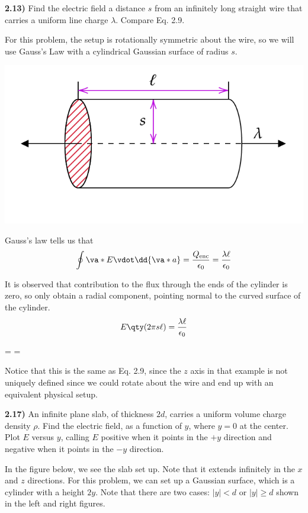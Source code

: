 \documentclass[12pt,a4paper]{article}
\newcommand{\prob}[2]{\textbf{#1)} #2}
\begin{document}
\prob{2.13}{Find the electric field a distance $s$ from an infinitely long straight wire that carries a uniform line charge $\lambda$. Compare Eq. 2.9.}

For this problem, the setup is rotationally symmetric about the wire, so we will use Gauss's Law with a cylindrical Gaussian surface of radius $s$.

\bef
\includegraphics[scale=0.5]{fig1.png}
\eef

Gauss's law tells us that
\begin{align*}
\oint \va*{E} \vdot \dd{\va*{a}} = \frac{Q_{\rm enc}}{\epsilon_0} = \frac{\lambda \ell}{\epsilon_0}
\end{align*}

It is observed that contribution to the flux through the ends of the cylinder is zero, so only obtain a radial component, pointing normal to the curved surface of the cylinder.
\begin{align*}
E\qty(2\pi s \ell) = \frac{\lambda \ell}{\epsilon_0}
\end{align*}
\begin{eqbox}
 =  \shat =  \shat
\end{eqbox}

Notice that this is the same as Eq. 2.9, since the $z$ axis in that example is not uniquely defined since we could rotate about the wire and end up with an equivalent physical setup.

\prob{2.17}{An infinite plane slab, of thickness $2d$, carries a uniform volume charge density $\rho$. Find the electric field, as a function of $y$, where $y = 0$ at the center. Plot $E$ versus $y$, calling $E$ positive when it points in the $+y$ direction and negative when it points in the $-
y$ direction.}

In the figure below, we see the slab set up. Note that it extends infinitely in the $x$ and $z$ directions. For this problem, we can set up a Gaussian surface, which is a cylinder with a height $2y$. Note that there are two cases: $|y| < d$ or $|y| \geq d$ shown in the left and right figures.
\end{document}

